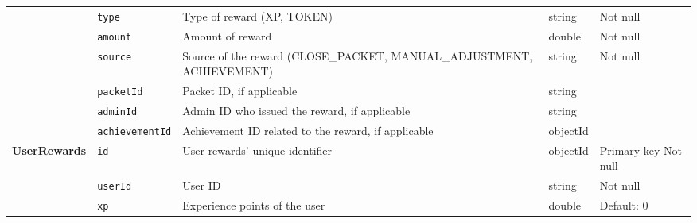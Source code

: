 \begin{landscape}
\begin{longtable}{ | m{} | m{} | m{} | m{} | m{} | }
        \cline{2-5}
                                                                         & \texttt{type}                             & Type of reward (XP, TOKEN)                                           & string        & Not null                      \\
        \cline{2-5}
                                                                         & \texttt{amount}                           & Amount of reward                                                     & double        & Not null                      \\
        \cline{2-5}
                                                                         & \texttt{source}                           & Source of the reward (CLOSE\_PACKET, MANUAL\_ADJUSTMENT, ACHIEVEMENT) & string       & Not null                      \\
        \cline{2-5}
                                                                         & \texttt{packetId}                         & Packet ID, if applicable                                             & string        &                               \\
        \cline{2-5}
                                                                         & \texttt{adminId}                          & Admin ID who issued the reward, if applicable                        & string        &                               \\
        \cline{2-5}
                                                                         & \texttt{achievementId}                    & Achievement ID related to the reward, if applicable                  & objectId      &                               \\
        \hline
        \multirow[t]{10}{5em}{\textbf{UserRewards}}                      & \texttt{id}                               & User rewards' unique identifier                                      & objectId      & Primary key \newline Not null \\
        \cline{2-5}
                                                                         & \texttt{userId}                           & User ID                                                              & string        & Not null                      \\
        \cline{2-5}
                                                                         & \texttt{xp}                               & Experience points of the user                                        & double        & Default: 0                    \\

\end{longtable}
\end{landscape}
